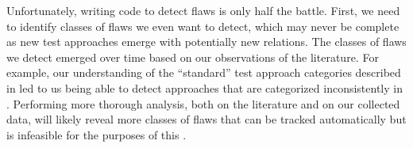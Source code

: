 Unfortunately, writing code to detect flaws is only half the battle. First, we
need to identify classes of flaws we even want to detect, which may never be
complete as new test approaches emerge with potentially new relations. The
classes of flaws we detect emerged over time based on our observations of the
literature. For example, our understanding of the ``standard'' test approach
categories described in  led to us being able to detect
approaches that are categorized inconsistently in .
Performing more thorough analysis, both on the literature and on our collected
data, will likely reveal more classes of flaws that can be tracked
automatically but is infeasible for the purposes of this \docType{}.
